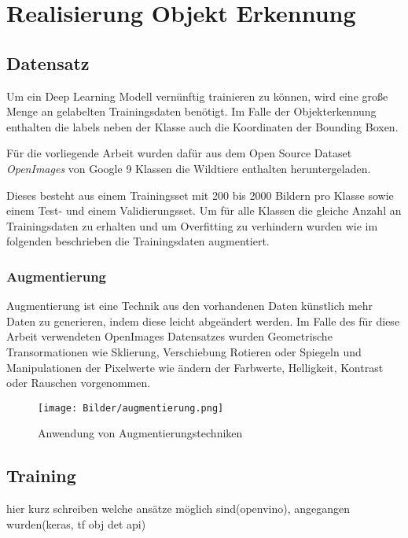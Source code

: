 \chapter{Realisierung Objekt Erkennung}\label{kap:objerk}

\section{Datensatz}\label{sec:dataset}

Um ein Deep Learning Modell vernünftig trainieren zu können, 
wird eine große Menge an gelabelten Trainingsdaten benötigt.
Im Falle der Objekterkennung enthalten die labels neben der 
Klasse auch die Koordinaten der Bounding Boxen.


Für die vorliegende Arbeit wurden dafür aus dem Open Source 
Dataset \textit{OpenImages} \cite{kuznetsovaOpenImagesDataset2018} 
von Google 9 Klassen die Wildtiere enthalten heruntergeladen.

Dieses besteht aus einem Trainingsset mit 200 bis 2000 Bildern pro 
Klasse sowie einem Test- und einem Validierungsset. Um für alle Klassen 
die gleiche Anzahl an Trainingsdaten zu erhalten und um Overfitting zu 
verhindern wurden wie im folgenden beschrieben die Trainingsdaten 
augmentiert.

\subsection{Augmentierung}

Augmentierung ist eine Technik aus den vorhandenen Daten 
künstlich mehr Daten zu generieren, indem diese leicht 
abgeändert werden. Im Falle des für diese Arbeit verwendeten
OpenImages Datensatzes wurden Geometrische Transormationen 
wie Sklierung, Verschiebung Rotieren oder Spiegeln und 
Manipulationen der Pixelwerte wie ändern der 
Farbwerte, Helligkeit, Kontrast oder Rauschen vorgenommen.

\begin{figure}[htb]
    \centering
    \label{fig:augmentierung}
    \texttt{[image: Bilder/augmentierung.png]}
    \caption{Anwendung von Augmentierungstechniken}
\end{figure}


\section{Training}

hier kurz schreiben welche ansätze möglich sind(openvino), angegangen
wurden(keras, tf obj det api)


